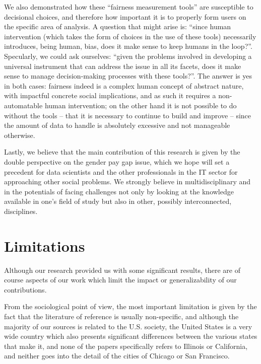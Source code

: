 We also demonstrated how these ``fairness measurement tools'' are susceptible to decisional choices, and therefore how important it is to properly form users on the specific area of analysis. A question that might arise is: ``since human intervention (which takes the form of choices in the use of these tools) necessarily introduces, being human, bias, does it make sense to keep humans in the loop?''. Specularly, we could ask ourselves: ``given the problems involved in developing a universal instrument that can address the issue in all its facets, does it make sense to manage decision-making processes with these tools?''. The answer is yes in both cases: fairness indeed is a complex human concept of abstract nature, with impactful concrete social implications, and as such it requires a non-automatable human intervention; on the other hand it is not possible to do without the tools -- that it is necessary to continue to build and improve -- since the amount of data to handle is absolutely excessive and not manageable otherwise.

Lastly, we believe that the main contribution of this research is given by the double perspective on the gender pay gap issue, which we hope will set a precedent for data scientists and the other professionals in the IT sector for approaching other social problems. We strongly believe in multidisciplinary and in the potentials of facing challenges not only by looking at the knowledge available in one's field of study but also in other, possibly interconnected, disciplines.


\section{Limitations}
Although our research provided us with some significant results, there are of course aspects of our work which limit the impact or generalizability of our contributions.

From the sociological point of view, the most important limitation is given by the fact that the literature of reference is usually non-specific, and although the majority of our sources is related to the U.S. society, the United States is a very wide country which also presents significant differences between the various states that make it, and none of the papers specifically refers to Illinois or California, and neither goes into the detail of the cities of Chicago or San Francisco.

